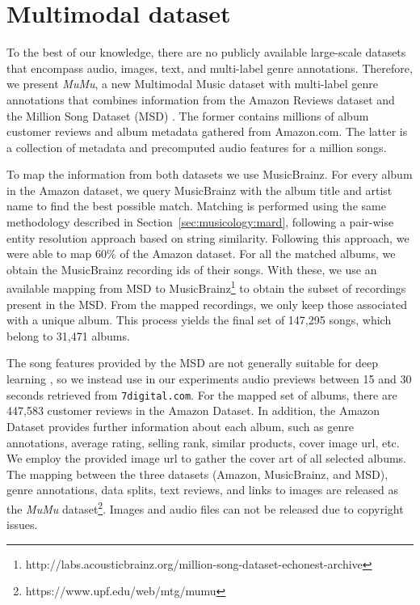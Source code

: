 \section{Multimodal dataset}\label{sec:multi-class:mumu}

To the best of our knowledge, there are no publicly available large-scale datasets that encompass audio, images, text, and multi-label genre annotations. %
Therefore, we present \emph{MuMu}, a new Multimodal Music dataset with multi-label genre annotations that combines information from the Amazon Reviews dataset \citep{mcauley2015image} and the Million Song Dataset (MSD) \citep{Bertin-Mahieux2011}. 
The former contains millions of album customer reviews and album metadata gathered from Amazon.com. 
The latter is a collection of metadata and precomputed audio features for a million songs. 

To map the information from both datasets we use MusicBrainz. 
For every album in the Amazon dataset, we query MusicBrainz with the album title and artist name to find the best possible match. Matching is performed using the same methodology described in Section~\ref{sec:musicology:mard}, following a pair-wise entity resolution approach based on string similarity. Following this approach, we were able to map 60\% of the Amazon dataset.
For all the matched albums, we obtain the MusicBrainz recording ids of their songs. 
With these, we use an available mapping from MSD to MusicBrainz\footnote{http://labs.acousticbrainz.org/million-song-dataset-echonest-archive} to obtain the subset of recordings present in the MSD. 
From the mapped recordings, we only keep those associated with a unique album.
This process yields the final set of 147,295 songs, which belong to 31,471 albums.

The song features provided by the MSD are not generally suitable for deep learning \citep{Oord2013}, so we instead use in our experiments audio previews between 15 and 30 seconds retrieved from \texttt{7digital.com}.
For the mapped set of albums, there are 447,583 customer reviews in the Amazon Dataset. 
In addition, the Amazon Dataset provides further information about each album, such as genre annotations, average rating, selling rank, similar products, cover image url, etc. 
We employ the provided image url to gather the cover art of all selected albums. 
The mapping between the three datasets (Amazon, MusicBrainz, and MSD), genre annotations, data splits, text reviews, and links to images are released as the \emph{MuMu} dataset\footnote{https://www.upf.edu/web/mtg/mumu}. Images and audio files can not be released due to copyright issues.

